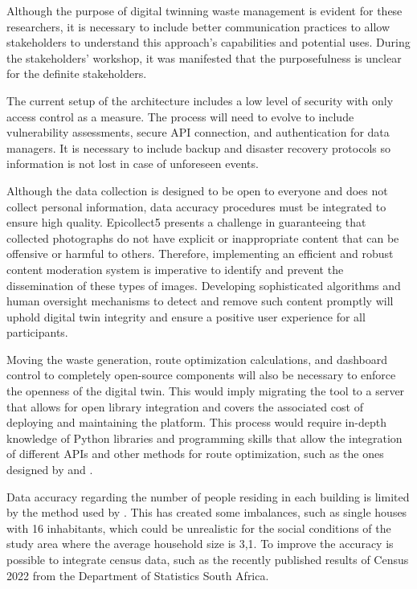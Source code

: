 \documentclass[authoryear,preprint,review,12pt]{elsarticle}
\begin{document}
    Although the purpose of digital twinning waste management is evident for these researchers, it is necessary to include better communication practices to allow stakeholders to understand this approach's capabilities and potential uses. During the stakeholders’ workshop, it was manifested that the purposefulness is unclear for the definite stakeholders.

    The current setup of the architecture includes a low level of security with only access control as a measure. The process will need to evolve to include vulnerability assessments, secure API connection, and authentication for data managers. It is necessary to include backup and disaster recovery protocols so information is not lost in case of unforeseen events.

    Although the data collection is designed to be open to everyone and does not collect personal information, data accuracy procedures must be integrated to ensure high quality. Epicollect5 presents a challenge in guaranteeing that collected photographs do not have explicit or inappropriate content that can be offensive or harmful to others. Therefore, implementing an efficient and robust content moderation system is imperative to identify and prevent the dissemination of these types of images. Developing sophisticated algorithms and human oversight mechanisms to detect and remove such content promptly will uphold digital twin integrity and ensure a positive user experience for all participants.

    Moving the waste generation, route optimization calculations, and dashboard control to completely open-source components will also be necessary to enforce the openness of the digital twin. This would imply migrating the tool to a server that allows for open library integration and covers the associated cost of deploying and maintaining the platform. This process would require in-depth knowledge of Python libraries and programming skills that allow the integration of different APIs and other methods for route optimization, such as the ones designed by \citet{Coupey2023} and \cite{montagneVRPyPythonPackage2020}.

    Data accuracy regarding the number of people residing in each building is limited by the method used by \cite{Schiavina2022}. This has created some imbalances, such as single houses with 16 inhabitants, which could be unrealistic for the social conditions of the study area where the average household size is 3,1. To improve the accuracy is possible to integrate census data, such as the recently published results of Census 2022 from the Department of Statistics South Africa.
\end{document}
